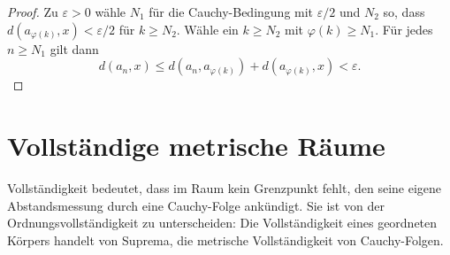 \documentclass[main.tex]{subfiles}
\begin{document}
\begin{proof}
Zu \(\varepsilon>0\) wähle \(N_1\) für die Cauchy-Bedingung mit
\(\varepsilon/2\) und \(N_2\) so, dass
\(d(a_{\varphi(k)},x)<\varepsilon/2\) für \(k\geq N_2\). Wähle ein
\(k\geq N_2\) mit \(\varphi(k)\geq N_1\). Für jedes \(n\geq N_1\) gilt
dann
\[
 d(a_n,x)\leq d(a_n,a_{\varphi(k)})
               +d(a_{\varphi(k)},x)<\varepsilon.
\]
\end{proof}

\section{Vollständige metrische Räume}


Vollständigkeit bedeutet, dass im Raum kein Grenzpunkt fehlt, den seine
eigene Abstandsmessung durch eine Cauchy-Folge ankündigt. Sie ist von der
Ordnungsvollständigkeit zu unterscheiden: Die Vollständigkeit eines
geordneten Körpers handelt von Suprema, die metrische Vollständigkeit von
Cauchy-Folgen.
\end{document}
